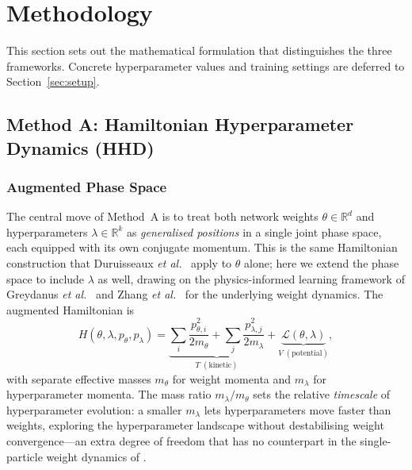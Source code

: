 \documentclass[11pt]{article}
\theoremstyle{definition}
\begin{document}

\section{Methodology}

This section sets out the mathematical formulation that
distinguishes the three frameworks. Concrete hyperparameter values
and training settings are deferred to Section~\ref{sec:setup}.

\subsection{Method A: Hamiltonian Hyperparameter Dynamics (HHD)}

\subsubsection{Augmented Phase Space}

The central move of Method~A is to treat both network weights
$\theta\in\mathbb{R}^d$ and hyperparameters $\lambda\in\mathbb{R}^k$
as \emph{generalised positions} in a single joint phase space, each
equipped with its own conjugate momentum. This is the same Hamiltonian
construction that Duruisseaux \emph{et al.}~\cite{duruisseaux2021adaptive}
apply to $\theta$ alone; here we extend the phase space to include
$\lambda$ as well, drawing on the physics-informed learning framework
of Greydanus \emph{et al.}~\cite{greydanus2019} and Zhang \emph{et
al.}~\cite{zhang2025} for the underlying weight dynamics. The
augmented Hamiltonian is
\begin{equation}
H(\theta,\lambda,p_\theta,p_\lambda)
  = \underbrace{\sum_i\frac{p_{\theta,i}^2}{2m_\theta}
    + \sum_j\frac{p_{\lambda,j}^2}{2m_\lambda}}_{T\;(\text{kinetic})}
  + \underbrace{\mathcal{L}(\theta,\lambda)}_{V\;(\text{potential})},
\label{eq:augH}
\end{equation}
with separate effective masses $m_\theta$ for weight momenta and
$m_\lambda$ for hyperparameter momenta. The mass ratio
$m_\lambda/m_\theta$ sets the relative \emph{timescale} of
hyperparameter evolution: a smaller $m_\lambda$ lets hyperparameters
move faster than weights, exploring the hyperparameter landscape
without destabilising weight convergence---an extra degree of freedom
that has no counterpart in the single-particle weight dynamics of
\cite{duruisseaux2021adaptive}.
\end{document}
